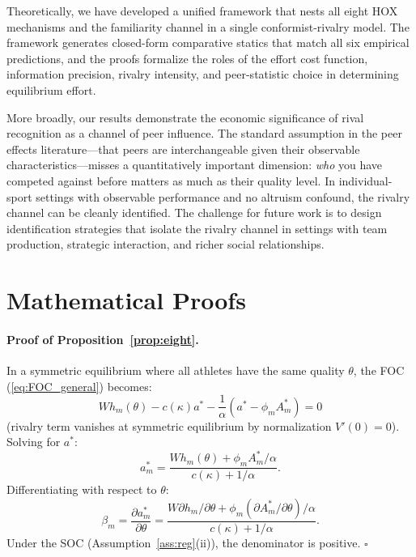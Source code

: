 \documentclass[12pt]{article}
\theoremstyle{definition}
\theoremstyle{remark}
\begin{document}
Theoretically, we have developed a unified framework that nests all eight HOX
mechanisms and the familiarity channel in a single conformist-rivalry model.
The framework generates closed-form comparative statics that match all six
empirical predictions, and the proofs formalize the roles of the effort cost
function, information precision, rivalry intensity, and peer-statistic choice
in determining equilibrium effort.

More broadly, our results demonstrate the economic significance of rival
recognition as a channel of peer influence.
The standard assumption in the peer effects literature---that peers are
interchangeable given their observable characteristics---misses a quantitatively
important dimension: \textit{who} you have competed against before matters as
much as their quality level.
In individual-sport settings with observable performance and no altruism
confound, the rivalry channel can be cleanly identified.
The challenge for future work is to design identification strategies that
isolate the rivalry channel in settings with team production, strategic
interaction, and richer social relationships.

\clearpage
\appendix

\section{Mathematical Proofs}
\label{app:proofs}

\paragraph{Proof of Proposition~\ref{prop:eight}.}

In a symmetric equilibrium where all athletes have the same quality $\theta$,
the FOC (\ref{eq:FOC_general}) becomes:
\begin{equation*}
W h_m(\theta) - c(\kappa) a^* - \frac{1}{\alpha}(a^* - \phi_m A_m^*) = 0
\end{equation*}
(rivalry term vanishes at symmetric equilibrium by normalization $V'(0)=0$).
Solving for $a^*$:
\begin{equation*}
a_m^* = \frac{W h_m(\theta) + \phi_m A_m^*/\alpha}{c(\kappa) + 1/\alpha}.
\end{equation*}
Differentiating with respect to $\theta$:
\begin{equation*}
\beta_m = \frac{\partial a_m^*}{\partial\theta}
= \frac{W \partial h_m/\partial\theta + \phi_m (\partial A_m^*/\partial\theta) /\alpha}
       {c(\kappa)+1/\alpha}.
\end{equation*}
Under the SOC (Assumption~\ref{ass:reg}(ii)), the denominator is positive.
$\square$
\end{document}
